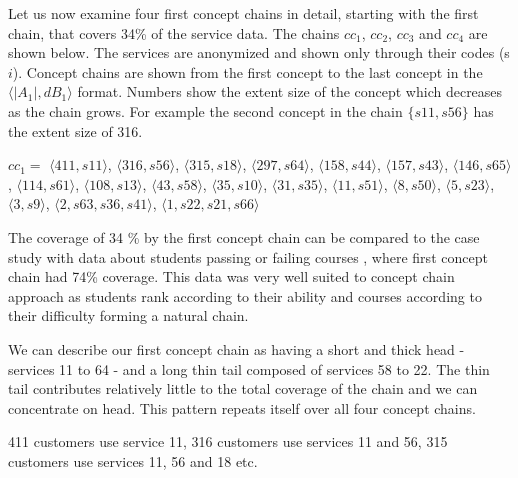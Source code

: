 \documentclass[acmconf,authordraft]{acmart}
\begin{document}
Let us now examine four first concept chains in detail, starting with the first chain, that covers 34\% of the service data. The chains $cc_1$, $cc_2$, $cc_3$ and $cc_4$ are shown below. The services are anonymized and shown only through their codes (s$i$). Concept chains are shown from the first concept to the last concept in the $\langle|A_1|, dB_1 \rangle$ format. Numbers show the extent size of the concept which decreases as the chain grows.  For example the second concept in the chain $\{s11, s56\}$ has the extent size of 316.

$cc_1 = $
$\langle 411, {s11} \rangle$,
$\langle 316, {s56} \rangle$,
$\langle 315, {s18} \rangle$,
$\langle 297, {s64} \rangle$,
$\langle 158, {s44} \rangle$,
$\langle 157, {s43} \rangle$,
$\langle 146, {s65} \rangle$,
$\langle 114, {s61} \rangle$,
$\langle 108, {s13} \rangle$,
$\langle 43, {s58} \rangle$,
$\langle 35, {s10} \rangle$,
$\langle 31, {s35} \rangle$,
$\langle 11, {s51} \rangle$,
$\langle 8, {s50} \rangle$,
$\langle 5, {s23} \rangle$,
$\langle 3, {s9} \rangle$,
$\langle 2, {s63, s36, s41} \rangle$,
$\langle 1, {s22, s21, s66} \rangle$



The coverage of 34 \% by the first concept chain can be compared to the case study with data about students passing or failing  courses \cite{torim_covering_2019}, where first concept chain had   74\% coverage. This data was very well suited to concept chain approach as students rank according to their ability and courses according to their difficulty forming a natural chain.

We can describe our first concept chain as having a short and thick head - services 11 to 64 - and a long thin tail composed of services 58 to 22. The thin tail contributes relatively little to the total coverage of the chain and we can concentrate on  head. This pattern repeats itself over all four concept chains.

411 customers use service 11, 316 customers use services 11 and 56, 315 customers use services 11, 56 and 18 etc.
\end{document}
